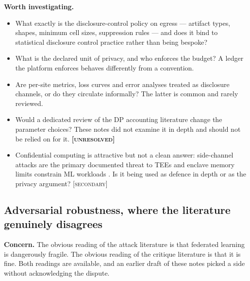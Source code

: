 \documentclass[11pt,a4paper]{article}
\newcommand{\flag}[1]{\textcolor{flagcolor}{\textbf{#1}}}
\newcommand{\secondary}{\textsc{[secondary]}}
\newcommand{\unresolved}{\flag{\textsc{[unresolved]}}}
\newcommand{\concern}[1]{\par\medskip\noindent\textbf{Concern.} #1}
\newcommand{\investigate}{\par\smallskip\noindent\textbf{Worth investigating.}}
\begin{document}
\investigate
\begin{itemize}
  \item What exactly is the disclosure-control policy on egress --- artifact
  types, shapes, minimum cell sizes, suppression rules --- and does it bind
  to statistical disclosure control practice \citep{ritchie_fivesafes}
  rather than being bespoke?
  \item What is the declared unit of privacy, and who enforces the budget?
  A ledger the platform enforces behaves differently from a convention.
  \item Are per-site metrics, loss curves and error analyses treated as
  disclosure channels, or do they circulate informally? The latter is
  common and rarely reviewed.
  \item Would a dedicated review of the DP accounting literature change the
  parameter choices? These notes did not examine it in depth and should not
  be relied on for it. \unresolved
  \item Confidential computing is attractive but not a clean answer:
  side-channel attacks are the primary documented threat to TEEs and enclave
  memory limits constrain ML workloads \citep{teesok2022}. Is it being used
  as defence in depth or as the privacy argument? \secondary
\end{itemize}

\subsection{Adversarial robustness, where the literature genuinely disagrees}
\label{sec:adversarial}

\concern{The obvious reading of the attack literature is that federated
learning is dangerously fragile. The obvious reading of the critique
literature is that it is fine. Both readings are available, and an earlier
draft of these notes picked a side without acknowledging the dispute.}
\end{document}
